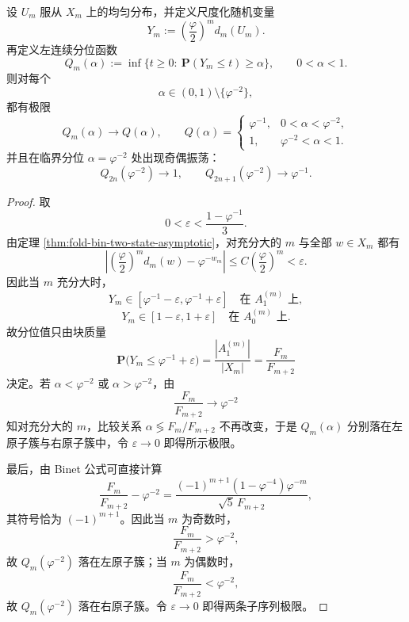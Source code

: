 \begin{theorem}[中心投影的分位二原子塌缩]\label{thm:xi-time-part70ab-uniform-quantile-two-atom-collapse}
设 \(U_m\) 服从 \(X_m\) 上的均匀分布，并定义尺度化随机变量
\[
Y_m:=\left(\frac{\varphi}{2}\right)^m d_m(U_m).
\]
再定义左连续分位函数
\[
Q_m(\alpha):=\inf\{t\ge 0:\ \mathbf P(Y_m\le t)\ge \alpha\},
\qquad
0<\alpha<1.
\]
则对每个
\[
\alpha\in(0,1)\setminus\{\varphi^{-2}\},
\]
都有极限
\[
Q_m(\alpha)\longrightarrow Q(\alpha),
\qquad
Q(\alpha)=
\begin{cases}
\varphi^{-1}, & 0<\alpha<\varphi^{-2},\\[2mm]
1, & \varphi^{-2}<\alpha<1.
\end{cases}
\]
并且在临界分位 \(\alpha=\varphi^{-2}\) 处出现奇偶振荡：
\[
Q_{2n}(\varphi^{-2})\longrightarrow 1,
\qquad
Q_{2n+1}(\varphi^{-2})\longrightarrow \varphi^{-1}.
\]
\end{theorem}
\begin{proof}
取
\[
0<\varepsilon<\frac{1-\varphi^{-1}}{3}.
\]
由定理 \ref{thm:fold-bin-two-state-asymptotic}，对充分大的 \(m\) 与全部 \(w\in X_m\) 都有
\[
\left|\left(\frac{\varphi}{2}\right)^m d_m(w)-\varphi^{-w_m}\right|
\le
C\left(\frac{\varphi}{2}\right)^m<\varepsilon.
\]
因此当 \(m\) 充分大时，
\[
Y_m\in[\varphi^{-1}-\varepsilon,\varphi^{-1}+\varepsilon]
\quad\text{在 }A_1^{(m)}\text{ 上},
\]
\[
Y_m\in[1-\varepsilon,1+\varepsilon]
\quad\text{在 }A_0^{(m)}\text{ 上}.
\]
故分位值只由块质量
\[
\mathbf P\bigl(Y_m\le \varphi^{-1}+\varepsilon\bigr)
=
\frac{|A_1^{(m)}|}{|X_m|}
=
\frac{F_m}{F_{m+2}}
\]
决定。若 \(\alpha<\varphi^{-2}\) 或 \(\alpha>\varphi^{-2}\)，由
\[
\frac{F_m}{F_{m+2}}\longrightarrow \varphi^{-2}
\]
知对充分大的 \(m\)，比较关系 \(\alpha\lessgtr F_m/F_{m+2}\) 不再改变，于是 \(Q_m(\alpha)\) 分别落在左原子簇与右原子簇中，令 \(\varepsilon\to 0\) 即得所示极限。

最后，由 Binet 公式可直接计算
\[
\frac{F_m}{F_{m+2}}-\varphi^{-2}
=
\frac{(-1)^{m+1}(1-\varphi^{-4})\varphi^{-m}}{\sqrt5\,F_{m+2}},
\]
其符号恰为 \((-1)^{m+1}\)。因此当 \(m\) 为奇数时，
\[
\frac{F_m}{F_{m+2}}>\varphi^{-2},
\]
故 \(Q_m(\varphi^{-2})\) 落在左原子簇；当 \(m\) 为偶数时，
\[
\frac{F_m}{F_{m+2}}<\varphi^{-2},
\]
故 \(Q_m(\varphi^{-2})\) 落在右原子簇。令 \(\varepsilon\to 0\) 即得两条子序列极限。
\end{proof}

